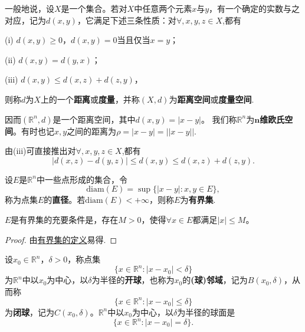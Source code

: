 \documentclass[../../main.tex]{subfiles}%
\begin{document}
\begin{definition}[距离空间]\label{definition:距离空间}
一般地说，设\(X\)是一个集合。若对\(X\)中任意两个元素\(x\)与\(y\)，有一个确定的实数与之对应，记为\(d(x,y)\)，它满足下述三条性质：对$\forall,x,y,z\in X$,都有

(i) \(d(x,y)\geqslant0\)，\(d(x,y)=0\)当且仅当\(x = y\)；

(ii) \(d(x,y)=d(y,x)\)；

(iii) \(d(x,y)\leqslant d(x,z)+d(z,y)\)，

则称\(d\)为\(X\)上的一个\textbf{距离}或\textbf{度量}，并称\((X,d)\)为\textbf{距离空间}或\textbf{度量空间}.
\end{definition}
\begin{note}
因而\((\mathbb{R}^n,d)\)是一个距离空间，其中\(d(x,y)=|x - y|\)。
我们称\(\mathbb{R}^n\)为\textbf{\(\boldsymbol{n}\)维欧氏空间}。有时也记$x,y$之间的距离为$\rho = |x-y|=||x-y||.$
\end{note}
\begin{remark}
由(iii)可直接推出对$\forall,x,y,z\in X$,都有
\[
|d(x,z)-d(y,z)|\leqslant d(x,y)\leqslant d(x,z)+d(z,y).
\]
\end{remark}

\begin{definition}[点集的直径与有界集]\label{definition:点集的直径与有界集}
设\(E\)是\(\mathbb{R}^n\)中一些点形成的集合，令
\[\text{diam}(E)=\sup\{|x - y|:x,y\in E\},\]
称为点集\(E\)的\textbf{直径}。若\(\text{diam}(E)<+\infty\)，则称\(E\)为\textbf{有界集}.
\end{definition}

\begin{proposition}[有界集的充要条件]\label{proposition:有界集的充要条件}
  \(E\)是有界集的充要条件是，存在\(M > 0\)，使得\(\forall x\in E\)都满足\(|x|\leqslant M\)。
\end{proposition}
\begin{proof}
  由\hyperref[definition:点集的直径与有界集]{有界集的定义}易得.
\end{proof}

\begin{definition}[点的(球)邻域]\label{definition:点的(球)邻域}
  设\(x_0\in\mathbb{R}^n\)，\(\delta>0\)，称点集
\[\{x\in\mathbb{R}^n:|x - x_0|<\delta\}\]
为\(\mathbb{R}^n\)中以\(x_0\)为中心，以\(\delta\)为半径的\textbf{开球}，也称为\(x_0\)的\textbf{(球)邻域}，记为\(B(x_0,\delta)\)，从而称
\[\{x\in\mathbb{R}^n:|x - x_0|\leqslant\delta\}\]
为\textbf{闭球}，记为\(C(x_0,\delta)\)。\(\mathbb{R}^n\)中以\(x_0\)为中心，以\(\delta\)为半径的球面是
\[\{x\in\mathbb{R}^n:|x - x_0|=\delta\}.\]
\end{definition}
\end{document}
